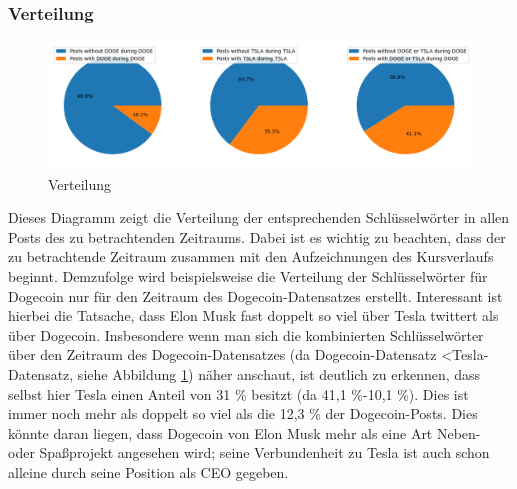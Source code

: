\documentclass{article}
\begin{document}
\subsubsection{Verteilung} \label{Verteilung}
\begin{figure}[h]
  	\centering
  	\includegraphics[width=\textwidth]{../imgs/Verteilung.png}
 	\caption{Verteilung}
 	\label{fig:Verteilung}
\end{figure}
Dieses Diagramm zeigt die Verteilung der entsprechenden Schlüsselwörter in allen Posts des zu betrachtenden Zeitraums.
Dabei ist es wichtig zu beachten, dass der zu betrachtende Zeitraum zusammen mit den Aufzeichnungen des Kursverlaufs beginnt.
Demzufolge wird beispielsweise die Verteilung der Schlüsselwörter für Dogecoin nur für den Zeitraum des Dogecoin-Datensatzes erstellt.
Interessant ist hierbei die Tatsache, dass Elon Musk fast doppelt so viel über Tesla twittert als über Dogecoin.
Insbesondere wenn man sich die kombinierten Schlüsselwörter über den Zeitraum des Dogecoin-Datensatzes (da Dogecoin-Datensatz \textless Tesla-Datensatz, siehe Abbildung \ref{fig:Verteilung}) näher anschaut, ist deutlich zu erkennen, dass selbst hier Tesla einen Anteil von 31 \% besitzt (da 41,1 \%-10,1 \%).
Dies ist immer noch mehr als doppelt so viel als die 12,3 \% der Dogecoin-Posts.
Dies könnte daran liegen, dass Dogecoin von Elon Musk mehr als eine Art Neben- oder Spaßprojekt angesehen wird; seine Verbundenheit zu Tesla ist auch schon alleine durch seine Position als CEO gegeben.
\end{document}
